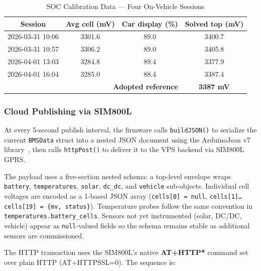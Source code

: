 \begin{table}[h]
    \centering
    \caption{SOC Calibration Data — Four On-Vehicle Sessions}
    \label{tab:soc-cal}
    \begin{tabular}{cccc}
        \toprule
        \textbf{Session} & \textbf{Avg cell (mV)} & \textbf{Car display (\%)} & \textbf{Solved top (mV)} \\
        \midrule
        2026-03-31 10:06 & 3301.6 & 89.0 & 3400.7 \\
        2026-03-31 10:57 & 3306.2 & 89.0 & 3405.8 \\
        2026-04-01 13:03 & 3284.8 & 89.4 & 3377.9 \\
        2026-04-01 16:04 & 3285.0 & 88.4 & 3387.4 \\
        \midrule
        \multicolumn{3}{r}{\textbf{Adopted reference}} & \textbf{3387 mV} \\
        \bottomrule
    \end{tabular}
\end{table}

\subsubsection{Cloud Publishing via SIM800L}

At every 5-second publish interval, the firmware calls \texttt{buildJSON()} to serialize the current \texttt{BMSData} struct into a nested JSON document using the ArduinoJson v7 library~\cite{arduinojson}, then calls \texttt{httpPost()} to deliver it to the VPS backend via SIM800L GPRS.

The payload uses a five-section nested schema: a top-level envelope wraps \texttt{battery}, \texttt{temperatures}, \texttt{solar}, \texttt{dc\_dc}, and \texttt{vehicle} sub-objects. Individual cell voltages are encoded as a 1-based JSON array (\texttt{cells[0] = null}, \texttt{cells[1]\ldots cells[19] = \{mv, status\}}). Temperature probes follow the same convention in \texttt{temperatures.battery\_cells}. Sensors not yet instrumented (solar, DC/DC, vehicle) appear as \texttt{null}-valued fields so the schema remains stable as additional sensors are commissioned.

The HTTP transaction uses the SIM800L's native \textbf{AT+HTTP*} command set over plain HTTP (AT+HTTPSSL=0). The sequence is:


